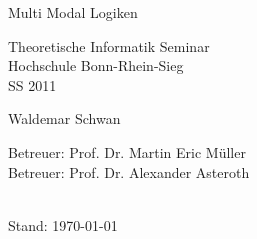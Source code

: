 
\begin{titlepage}
	
	\vspace*{0.8cm}
	
	\begin{center}
		\begin{Huge}
			Multi Modal Logiken
		\end{Huge}
	\end{center}
	
	\vspace*{2cm}
	
	\begin{center}
		\begin{Large}
			Theoretische Informatik Seminar\\
			Hochschule Bonn-Rhein-Sieg\\
			SS 2011
		\end{Large}			
	\end{center}

	\vspace*{3.5cm}
	
	\begin{center}
		\begin{Large}
			Waldemar Schwan 
		\end{Large}			
	\end{center}
	\vspace*{4.5cm}
	\begin{large}
		Betreuer: Prof. Dr. Martin Eric Müller \\
		Betreuer: Prof. Dr. Alexander Asteroth \\
	\end{large}
	\\
	Stand: \today
\end{titlepage}